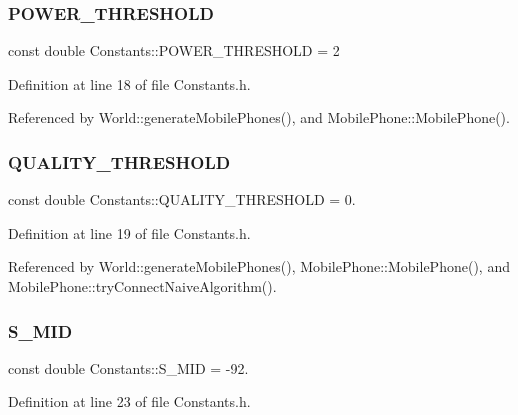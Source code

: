 \subsubsection{P\+O\+W\+E\+R\+\_\+\+T\+H\+R\+E\+S\+H\+O\+LD}
{\footnotesize\ttfamily const double Constants\+::\+P\+O\+W\+E\+R\+\_\+\+T\+H\+R\+E\+S\+H\+O\+LD = 2\hspace{0.3cm}{\ttfamily [static]}}



Definition at line 18 of file Constants.\+h.



Referenced by World\+::generate\+Mobile\+Phones(), and Mobile\+Phone\+::\+Mobile\+Phone().

\mbox{\label{class_constants_ac1fe084cae6ef71dce35c42a0e36a10a}} 
\subsubsection{Q\+U\+A\+L\+I\+T\+Y\+\_\+\+T\+H\+R\+E\+S\+H\+O\+LD}
{\footnotesize\ttfamily const double Constants\+::\+Q\+U\+A\+L\+I\+T\+Y\+\_\+\+T\+H\+R\+E\+S\+H\+O\+LD = 0.\hspace{0.3cm}{\ttfamily [static]}}



Definition at line 19 of file Constants.\+h.



Referenced by World\+::generate\+Mobile\+Phones(), Mobile\+Phone\+::\+Mobile\+Phone(), and Mobile\+Phone\+::try\+Connect\+Naive\+Algorithm().

\mbox{\label{class_constants_affec18434af9a317a655e7aa9a31aab2}} 
\subsubsection{S\+\_\+\+M\+ID}
{\footnotesize\ttfamily const double Constants\+::\+S\+\_\+\+M\+ID = -\/92.\hspace{0.3cm}{\ttfamily [static]}}



Definition at line 23 of file Constants.\+h.



